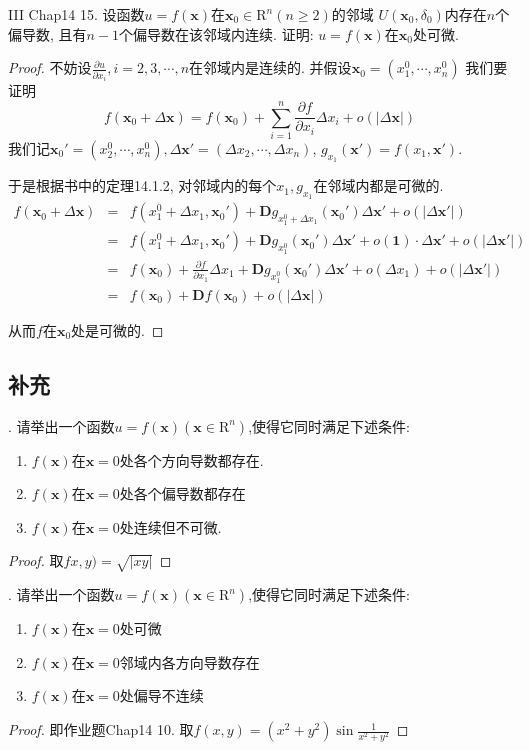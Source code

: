 \documentclass[a4paper,12pt]{article}
\begin{document}
\noindent III Chap14 15. 设函数$u=f(\bm{x})$在$\bm{x}_0\in\mathrm{R}^n(n\geq2)$的邻域
$U(\bm{x}_0,\delta_0)$内存在$n$个偏导数, 且有$n-1$个偏导数在该邻域内连续. 
证明: $u=f(\bm{x})$在$\bm{x}_0$处可微.
\begin{proof}
  不妨设$\frac{\partial u}{\partial x_i},i=2,3,\cdots,n$在邻域内是连续的. 
  并假设$\bm{x}_0=(x_1^0,\cdots,x_n^0)$
  我们要证明
  \[f(\bm{x}_0+\Delta \bm{x})=f(\bm{x}_0)+\sum_{i=1}^{n}\frac{\partial f}{\partial x_i}\Delta x_i+o(|\Delta \bm{x}|)\]
  我们记$\bm{x}_0'=(x_2^0,\cdots,x_n^0), \Delta \bm{x}'=(\Delta x_2,\cdots,\Delta x_n)$, $g_{x_1}(\bm{x}')=f(x_1,\bm{x}')$.

  于是根据书中的定理14.1.2, 对邻域内的每个$x_1,g_{x_1}$在邻域内都是可微的.
  \begin{eqnarray*}
    f(\bm{x}_0+\Delta \bm{x})&=&f(x_1^0+\Delta x_1,\bm{x}_0')+\bm{D}g_{x_1^0+\Delta x_1}(\bm{x}_0')\Delta\bm{x}'+o(|\Delta\bm{x}'|)\\
    &=&f(x_1^0+\Delta x_1,\bm{x}_0')+\bm{D}g_{x_1^0}(\bm{x}_0')\Delta\bm{x}'+o(\bm{1})\cdot\Delta\bm{x}'+o(|\Delta\bm{x}'|)\\
    &=&f(\bm{x}_0)+\frac{\partial f}{\partial x_1}\Delta x_1+\bm{D}g_{x_1^0}(\bm{x}_0')\Delta\bm{x}'+o(\Delta x_1)+o(|\Delta\bm{x}'|)\\
    &=&f(\bm{x}_0)+\bm{D}f(\bm{x}_0)+o(|\Delta\bm{x}|)
  \end{eqnarray*}

  从而$f$在$\bm{x}_0$处是可微的.
\end{proof}

\subsection*{补充}
. 请举出一个函数$u=f(\bm{x})(\bm{x}\in\mathrm{R}^n)$,使得它同时满足下述条件:
\begin{enumerate}
  \itemsep-0.5em 
  \item $f(\bm{x})$在$\bm{x}=0$处各个方向导数都存在.
  \item $f(\bm{x})$在$\bm{x}=0$处各个偏导数都存在
  \item $f(\bm{x})$在$\bm{x}=0$处连续但不可微.
\end{enumerate}
\begin{proof}
  取$fx,y)=\sqrt{|xy|}$
\end{proof}

. 请举出一个函数$u=f(\bm{x})(\bm{x}\in\mathrm{R}^n)$,使得它同时满足下述条件:
\begin{enumerate}
  \itemsep-0.5em 
  \item $f(\bm{x})$在$\bm{x}=0$处可微
  \item $f(\bm{x})$在$\bm{x}=0$邻域内各方向导数存在
  \item $f(\bm{x})$在$\bm{x}=0$处偏导不连续
\end{enumerate}
\begin{proof}
  即作业题Chap14 10. 取$f(x,y)=(x^2+y^2)\sin\frac{1}{x^2+y^2}$
\end{proof}
\end{document}
